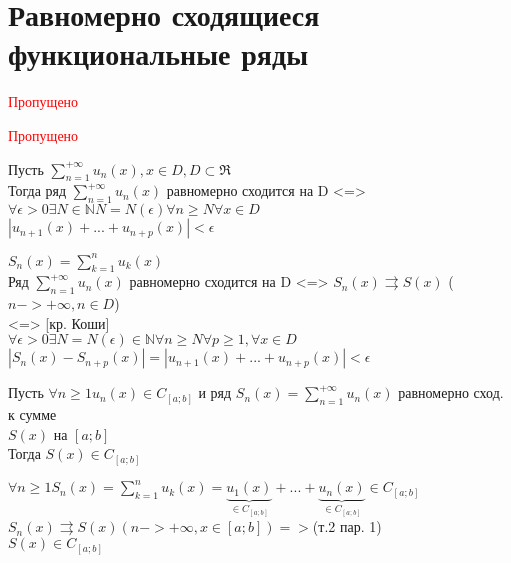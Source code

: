 \section{Равномерно сходящиеся функциональные ряды}

\begin{Def}
  \textcolor{red}{Пропущено}\\
\end{Def}

\begin{Def}
  \textcolor{red}{Пропущено}\\
\end{Def}

\begin{Th}
  Пусть $\sum \limits_{n=1}^{+ \infty} u_n(x), x\in D, D \subset \Re$\\
  Тогда ряд $\sum \limits_{n=1}^{+ \infty} u_n(x)$ равномерно сходится на D <=>\\
  $\forall \epsilon >0 \exists N \in \mathbb{N} N=N(\epsilon) \forall n\geqslant N \forall x \in D$\\
  $|u_{n+1}(x)+...+u_{n+p}(x)|<\epsilon$\\
\end{Th}

\begin{Proof}
  $S_n(x) = \sum \limits_{k=1}^{n} u_k(x)$\\
  Ряд  $\sum \limits_{n=1}^{+ \infty} u_n(x)$ равномерно сходится на D <=> $S_n(x)\rightrightarrows S(x)$ ($n->+\infty, n\in D$)\\
  <=> [кр. Коши]\\
  $\forall \epsilon >0 \exists N=N(\epsilon) \in \mathbb{N}  \forall n\geqslant N \forall p\geqslant 1, \forall x \in D$\\
  $|S_n(x)-S_{n+p}(x)|=|u_{n+1}(x)+...+u_{n+p}(x)|<\epsilon$\\
\end{Proof}

\begin{Th}
  Пусть $\forall n \geqslant 1 u_n(x)\in C_{[a;b]}$ и ряд  $S_n(x) = \sum \limits_{n=1}^{+ \infty} u_n(x)$ равномерно сход. к сумме\\
  $S(x)$ на $[a;b]$\\
  Тогда $S(x)\in C_{[a;b]}$\\
\end{Th}

\begin{Proof}
  $\forall n \geqslant 1 S_n(x) = \sum \limits_{k=1}^{n} u_k(x)=\underbrace{u_1(x)}_{\in C_{[a;b]}}+...+\underbrace{u_n(x)}_{\in C_{[a;b]}}\in C_{[a;b]}$\\
  $S_n(x)\rightrightarrows S(x) (n->+\infty, x \in [a;b])=>$(т.2 пар. 1)\\
  $S(x)\in C_{[a;b]}$\\
\end{Proof}

